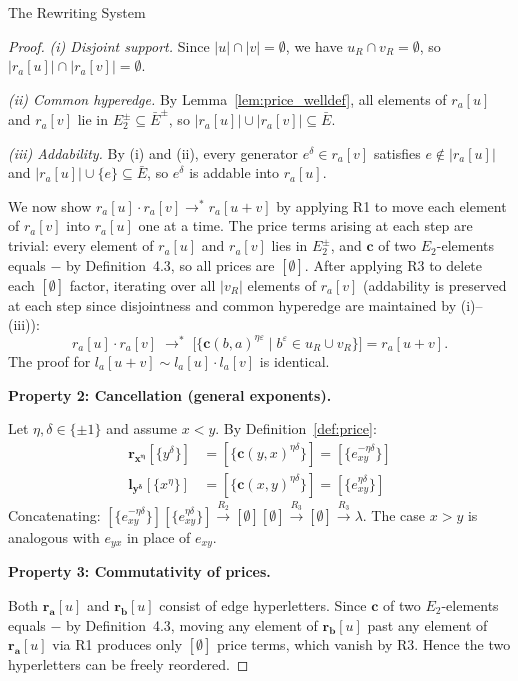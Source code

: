 \documentclass{article}
\theoremstyle{definition}
\theoremstyle{remark}
\theoremstyle{theorem}
\theoremstyle{definition}
\begin{document}
\begin{section}{The Rewriting System}
\begin{proof}
\noindent\textit{(i) Disjoint support.}
Since $|u| \cap |v| = \emptyset$, we have $u_R \cap v_R = \emptyset$, so
$|r_a[u]| \cap |r_a[v]| = \emptyset$.

\noindent\textit{(ii) Common hyperedge.}
By Lemma~\ref{lem:price_welldef}, all elements of $r_a[u]$ and $r_a[v]$ lie in
$E_2^{\pm} \subseteq \bar{E}^{\pm}$, so $|r_a[u]| \cup |r_a[v]| \subseteq \bar{E}$.

\noindent\textit{(iii) Addability.}
By (i) and (ii), every generator $e^{\delta} \in r_a[v]$ satisfies
$e \notin |r_a[u]|$ and $|r_a[u]| \cup \{e\} \subseteq \bar{E}$,
so $e^{\delta}$ is addable into $r_a[u]$.

We now show $r_a[u] \cdot r_a[v] \to^* r_a[u+v]$ by
applying R1 to move each element of $r_a[v]$ into $r_a[u]$ one at a time.
The price terms arising at each step are trivial: every element of $r_a[u]$
and $r_a[v]$ lies in $E_2^{\pm}$, and $\mathbf{c}$ of two $E_2$-elements equals $-$ by Definition~4.3, so all prices are $[\emptyset]$. After applying R3 to delete each $[\emptyset]$ factor,
iterating over all $|v_R|$ elements of $r_a[v]$ (addability is preserved at
each step since disjointness and common hyperedge are maintained by (i)--(iii)):
\[
  r_a[u] \cdot r_a[v]
  \;\to^*\;
  \bigl[\{ \mathbf{c}(b,a)^{\eta\varepsilon} \mid b^{\varepsilon} \in u_R \cup v_R \}\bigr]
  = r_a[u + v].
\]
The proof for $l_a[u+v] \sim l_a[u] \cdot l_a[v]$ is identical.

\textbf{Property 2: Cancellation (general exponents).}

Let $\eta,\delta \in \{\pm 1\}$ and assume $x < y$.
By Definition~\ref{def:price}:
\begin{align*}
\mathbf{r_{x^\eta}}[\{y^\delta\}] &= [\{\mathbf{c}(y,x)^{\eta\delta}\}] = [\{e_{xy}^{-\eta\delta}\}]\\
\mathbf{l_{y^\delta}}[\{x^\eta\}] &= [\{\mathbf{c}(x,y)^{\eta\delta}\}] = [\{e_{xy}^{\eta\delta}\}]
\end{align*}
Concatenating: $[\{e_{xy}^{-\eta\delta}\}][\{e_{xy}^{\eta\delta}\}]
\xrightarrow{R_2} [\emptyset][\emptyset] \xrightarrow{R_3} [\emptyset]\xrightarrow{R_3}  \lambda $.
The case $x > y$ is analogous with $e_{yx}$ in place of $e_{xy}$.

\textbf{Property 3: Commutativity of prices.}

Both $\mathbf{r_a}[u]$ and $\mathbf{r_b}[u]$ consist of edge hyperletters. Since $\mathbf{c}$ of two $E_2$-elements equals $-$ by Definition~4.3, moving any element of $\mathbf{r_b}[u]$ past any element of $\mathbf{r_a}[u]$ via R1 produces only $[\emptyset]$ price terms, which vanish by R3. Hence the two hyperletters can be freely reordered.


\end{proof}
\end{section}
\end{document}
